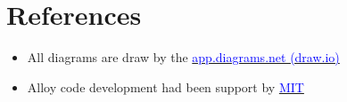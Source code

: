 \section{References}

\begin{itemize}
    \item All diagrams are draw by the \href{https://app.diagrams.net/} {\textcolor{blue} {app.diagrams.net (draw.io)}}
    \item Alloy code development had been support by \href{https://stuff.mit.edu/afs/athena/software/alloy_v4.2/alloy-language-reference.pdf} {\textcolor{blue}{MIT}}
\end{itemize}